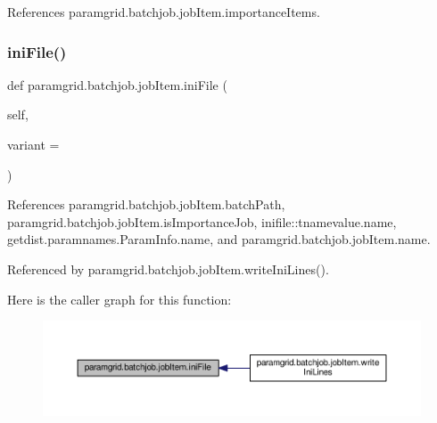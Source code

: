 References paramgrid.\+batchjob.\+job\+Item.\+importance\+Items.

\mbox{\label{classparamgrid_1_1batchjob_1_1jobItem_a5a3a41b8f0daafd574c2f88d909a1f10}} 
\subsubsection{\texorpdfstring{ini\+File()}{iniFile()}}
{\footnotesize\ttfamily def paramgrid.\+batchjob.\+job\+Item.\+ini\+File (\begin{DoxyParamCaption}\item[{}]{self,  }\item[{}]{variant = {\ttfamily \textquotesingle{}\textquotesingle{}} }\end{DoxyParamCaption})}



References paramgrid.\+batchjob.\+job\+Item.\+batch\+Path, paramgrid.\+batchjob.\+job\+Item.\+is\+Importance\+Job, inifile\+::tnamevalue.\+name, getdist.\+paramnames.\+Param\+Info.\+name, and paramgrid.\+batchjob.\+job\+Item.\+name.



Referenced by paramgrid.\+batchjob.\+job\+Item.\+write\+Ini\+Lines().

Here is the caller graph for this function\+:
\nopagebreak
\begin{figure}[H]
\begin{center}
\leavevmode
\includegraphics[width=350pt]{classparamgrid_1_1batchjob_1_1jobItem_a5a3a41b8f0daafd574c2f88d909a1f10_icgraph}
\end{center}
\end{figure}
\mbox{\label{classparamgrid_1_1batchjob_1_1jobItem_a935f89613b4c83962de849b6124f4626}} 
